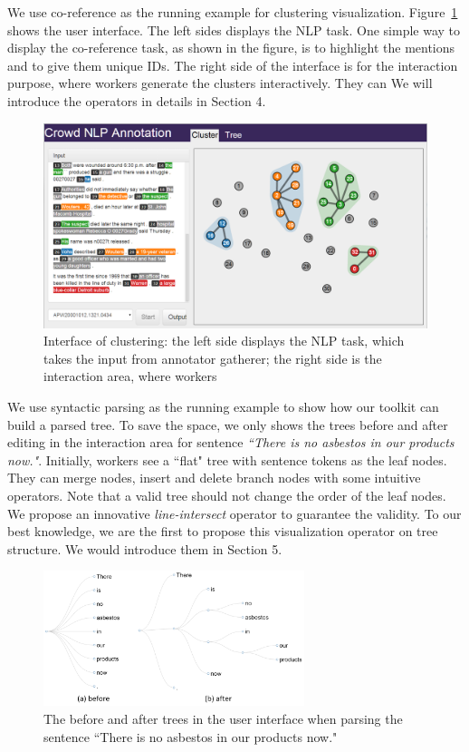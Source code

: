 We use co-reference as the running example for clustering visualization. Figure~\ref{fig:interface1.png} shows the user interface. The left sides displays the NLP task. One simple way to display the co-reference task, as shown in the figure, is to highlight the mentions and to give them unique IDs. The right side of the interface is for the interaction purpose, where workers generate the clusters interactively. They can We will introduce the operators in details in Section 4.
\begin{figure}
\centering
\includegraphics[width=6.1in]{figs/interface1_v2.png}
\caption{Interface of clustering: the left side displays the NLP task, which takes the input from annotator gatherer; the right side is the interaction area, where workers}
\label{fig:interface1.png}
\end{figure}

We use syntactic parsing as the running example to show how our toolkit can build a parsed tree. To save the space, we only shows the trees before and after editing in the interaction area for sentence {\em ``There is no asbestos in our products now."}. Initially, workers see a ``flat" tree with sentence tokens as the leaf nodes. They can merge nodes, insert and delete branch nodes with some intuitive operators. Note that a valid tree should not change the order of the leaf nodes. We propose an innovative {\em line-intersect} operator to guarantee the validity. To our best knowledge, we are the first to propose this visualization operator on tree structure. We would introduce them in Section 5.

\begin{figure}
\centering
\includegraphics[width=3in]{figs/overview_tree_editing.png}
\caption{The before and after trees in the user interface when parsing the sentence {``There is no asbestos in our products now."}}
\label{fig:interface2.png}
\end{figure}

